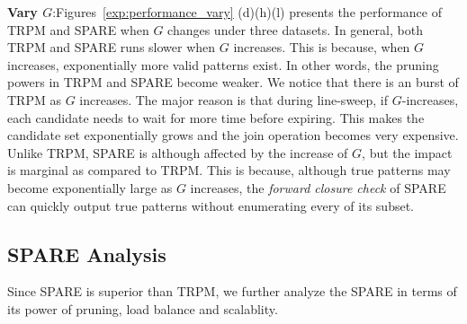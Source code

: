 \textbf{Vary $G$}:Figures~\ref{exp:performance_vary} (d)(h)(l) presents the performance
of TRPM and SPARE when $G$ changes under three datasets. In general, both TRPM and SPARE
runs slower when $G$ increases. This is because, when $G$ increases, exponentially more valid patterns
exist. In other words, the pruning powers in TRPM and SPARE become weaker. We notice
that there is an burst of TRPM as $G$ increases. The major reason is that 
during line-sweep, if $G$-increases, each candidate needs to wait for more time before expiring.
This makes the candidate set exponentially grows and 
the join operation becomes very expensive.
Unlike TRPM, SPARE is although affected by the increase of $G$, 
but the impact is marginal as compared
to TRPM. This is because, although true patterns may become 
exponentially large as $G$ increases, the \emph{forward closure check} of SPARE
can quickly output true patterns without enumerating every of its subset.








\subsection{SPARE Analysis}
Since SPARE is superior than TRPM,
we further analyze the SPARE in terms of its power of pruning, load balance
and scalablity.

